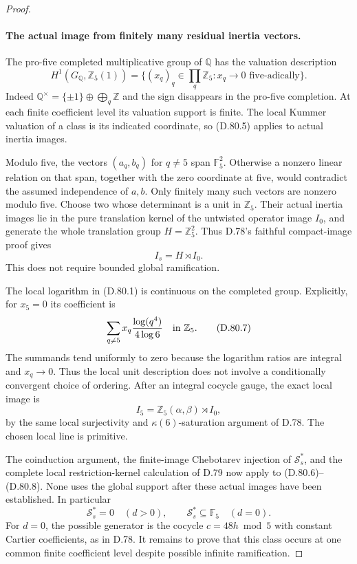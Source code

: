 \begin{proof}
\paragraph{The actual image from finitely many residual inertia vectors.}
The pro-five completed multiplicative group of \(\mathbb Q\)
has the valuation description
\[
 H^1(G_{\mathbb Q},\mathbb Z_5(1))
   =\{(x_q)_q\in\prod_q\mathbb Z_5:
                     x_q\longrightarrow0\text{ five-adically}\}.
                                                               \tag{D.80.5}
\]
Indeed \(\mathbb Q^\times=\{\pm1\}\oplus\bigoplus_q\mathbb Z\)
and the sign disappears in the pro-five completion. At each
finite coefficient level its valuation support is finite.
The local Kummer valuation of a class is its indicated
coordinate, so (D.80.5) applies to actual inertia images.

Modulo five, the vectors \((a_q,b_q)\) for \(q\ne5\)
span \(\mathbb F_5^2\). Otherwise a nonzero linear relation
on that span, together with the zero coordinate at five,
would contradict the assumed independence of \(a,b\).
Only finitely many such vectors are nonzero modulo five.
Choose two whose determinant is a unit in \(\mathbb Z_5\).
Their actual inertia images lie in the pure translation
kernel of the untwisted operator image \(I_0\), and
generate the whole translation group \(H=\mathbb Z_5^2\).
Thus D.78's faithful compact-image proof gives
\[
                         I_s=H\rtimes I_0.             \tag{D.80.6}
\]
This does not require bounded global ramification.

The local logarithm in (D.80.1) is continuous on the completed
group. Explicitly, for \(x_5=0\) its coefficient is
\[
      \sum_{q\ne5}x_q\frac{\log(q^4)}{4\log6}
                          \quad\hbox{in }\mathbb Z_5.
                                                               \tag{D.80.7}
\]
The summands tend uniformly to zero because the logarithm
ratios are integral and \(x_q\to0\). Thus the local unit
description does not involve a conditionally convergent
choice of ordering. After an integral cocycle gauge,
the exact local image is
\[
 I_5=\mathbb Z_5(\alpha,\beta)\rtimes I_0,              \tag{D.80.8}
\]
by the same local surjectivity and \(\kappa(6)\)-saturation
argument of D.78. The chosen local line is primitive.

The coinduction argument, the finite-image Chebotarev
injection of \(\mathcal S_s^*\), and the complete local
restriction-kernel calculation of D.79 now apply to
(D.80.6)--(D.80.8). None uses the global support after
these actual images have been established. In particular
\[
 \mathcal S_s^*=0\quad(d>0),\qquad
 \mathcal S_s^*\subseteq\mathbb F_5\quad(d=0).           \tag{D.80.9}
\]
For \(d=0\), the possible generator is the cocycle
\(c=48h\bmod5\) with constant Cartier coefficients,
as in D.78. It remains to prove that this class occurs
at one common finite coefficient level despite possible
infinite ramification.


\end{proof}
